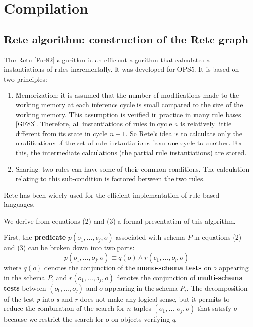 \section{Compilation}

\subsection{Rete algorithm: construction of the Rete graph}

The Rete [For82] algorithm is an efficient algorithm that calculates all
instantiations of rules incrementally. It was developed for OPS5. It is based on two
principles:

\begin{enumerate}
	
	\item Memorization: it is assumed that the number of modifications made
	to the working memory at each inference cycle is small compared to the
	size of the working memory. This assumption is verified in practice in
	many rule bases [GF83].  Therefore, all instantiations
	of rules in cycle $n$ is relatively little different from its state in cycle $n - 1$.
	So Rete's idea is to calculate only the modifications of the set of
	rule instantiations from one cycle to another. For this, the intermediate calculations (the
	partial rule instantiations) are stored.  
	
	\item Sharing: two rules can have some of their common conditions.
	The calculation relating to this sub-condition is factored between the two rules.
	
\end{enumerate}

Rete has been widely used for the efficient implementation of rule-based languages.

We derive from equations (2) and (3) a formal presentation of this algorithm.

First, the \textbf{predicate} $p(o_1, ..., o_j, o)$ associated with schema $P$ in equations (2) and (3)
can be \uline{broken down into two parts}:
\begin{equation}
p(o_1, ..., o_j, o) \equiv q(o) \wedge r(o_1, ..., o_j, o)
\nonumber
\end{equation}
where $q(o)$ denotes the conjunction of the \textbf{mono-schema tests} on $o$ appearing in
the schema $P$, and $r(o_1, ..., o_j, o)$ denotes the conjunction of \textbf{multi-schema tests} between
$(o_1, ..., o_j)$ and $o$ appearing in the schema $P_i$.  The decomposition of the test $p$ into $q$
and $r$ does not make any logical sense, but it permits to reduce the combination of
the search for $n$-tuples $(o_1, ..., o_j, o)$ that satisfy $p$ because we restrict the search for $o$
on objects verifying $q$.

